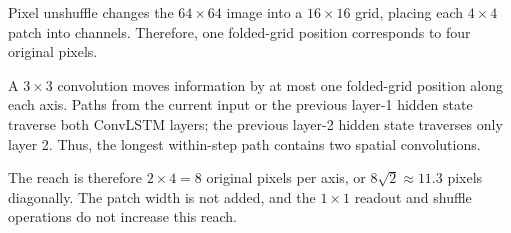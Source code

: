 Pixel unshuffle changes the $64\times64$ image into a $16\times16$ grid, placing each $4\times4$ patch into channels. Therefore, one folded-grid position corresponds to four original pixels.

A $3\times3$ convolution moves information by at most one folded-grid position along each axis. Paths from the current input or the previous layer-1 hidden state traverse both ConvLSTM layers; the previous layer-2 hidden state traverses only layer 2. Thus, the longest within-step path contains two spatial convolutions.

The reach is therefore $2\times4=8$ original pixels per axis, or $8\sqrt{2}\approx11.3$ pixels diagonally. The patch width is not added, and the $1\times1$ readout and shuffle operations do not increase this reach.
